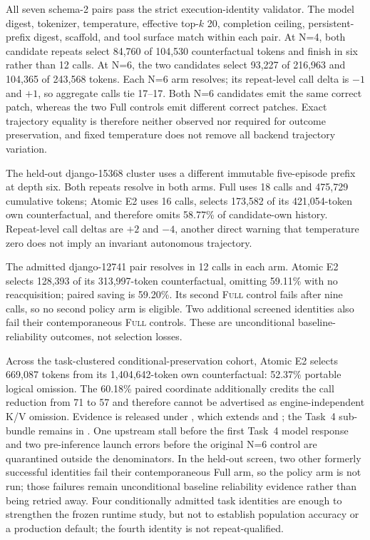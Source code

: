 \documentclass[11pt]{article}
\begin{document}
All seven schema-2 pairs pass the strict execution-identity validator.  The model
digest, tokenizer, temperature, effective top-$k$ 20, completion ceiling,
persistent-prefix digest, scaffold, and tool surface match within each pair.
At N=4, both candidate repeats select 84,760 of 104,530 counterfactual tokens
and finish in six rather than 12 calls.  At N=6, the two candidates select
93,227 of 216,963 and 104,365 of 243,568 tokens.  Each N=6 arm resolves; its
repeat-level call delta is $-1$ and $+1$, so aggregate calls tie 17--17.  Both
N=6 candidates emit the same correct patch, whereas the two Full controls emit
different correct patches.  Exact trajectory equality is therefore neither
observed nor required for outcome preservation, and fixed temperature does not
remove all backend trajectory variation.

The held-out django-15368 cluster uses a different immutable five-episode
prefix at depth six.  Both repeats resolve in both arms.  Full uses 18 calls
and 475,729 cumulative tokens; Atomic E2 uses 16 calls, selects 173,582 of its
421,054-token own counterfactual, and therefore omits 58.77\% of candidate-own
history.  Repeat-level call deltas are $+2$ and $-4$, another direct warning
that temperature zero does not imply an invariant autonomous trajectory.

The admitted django-12741 pair resolves in 12 calls in each arm.  Atomic E2
selects 128,393 of its 313,997-token counterfactual, omitting 59.11\% with no
reacquisition; paired saving is 59.20\%.  Its second \textsc{Full} control
fails after nine calls, so no second policy arm is eligible.  Two additional
screened identities also fail their contemporaneous \textsc{Full} controls.
These are unconditional baseline-reliability outcomes, not selection losses.

Across the task-clustered conditional-preservation cohort, Atomic E2 selects
669,087 tokens from its 1,404,642-token own counterfactual: 52.37\% portable
logical omission.  The 60.18\% paired coordinate additionally credits the
call reduction from 71 to 57 and therefore cannot be advertised as
engine-independent K/V omission.  Evidence is released under
, which extends
 and
; the Task~4 sub-bundle remains in
.  One upstream stall before the first
Task~4 model response and two pre-inference launch errors before the original
N=6 control are quarantined outside the denominators.  In the held-out screen,
two other formerly successful identities fail their contemporaneous Full arm,
so the policy arm is not run; those failures remain unconditional baseline
reliability evidence rather than being retried away.  Four conditionally
admitted task identities are enough to strengthen the frozen runtime study,
but not to establish population accuracy or a production default; the fourth
identity is not repeat-qualified.
\end{document}
